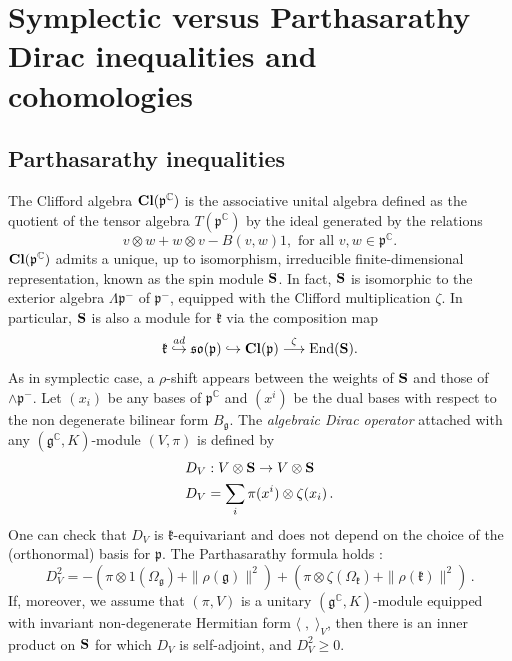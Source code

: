 \documentclass{amsart}[draft,11pt]
\newcommand{\mg}{\mathfrak{g}}
\newcommand{\mk}{\mathfrak{k}}
\newcommand{\fg}{{\mathfrak{g}}}
\newcommand{\fk}{{\mathfrak{k}}}
\newcommand{\fp}{{\mathfrak{p}}}
\numberwithin{equation}{section}
\theoremstyle{definition}
\begin{document}
\section{Symplectic versus Parthasarathy Dirac inequalities and cohomologies}
\label{comparison}

\subsection{Parthasarathy inequalities}

The Clifford algebra ${\bf Cl}(\fp^\mathbb{C})$ is the associative unital algebra defined as the quotient of the tensor algebra $T(\fp^\mathbb{C})$ by the ideal generated by the relations
\begin{equation*}
v\otimes w+w\otimes v-B(v,w) 1,\text{ for all }v,w\in \fp^\mathbb{C}.
\end{equation*}
${\bf Cl}(\fp^\mathbb{C})$ admits a unique, up to isomorphism, irreducible finite-dimensional representation, known as the spin module ${\bf S}$. In fact, ${\bf S}$ is isomorphic to the exterior algebra $\Lambda\fp^-$ of $\fp^-$, equipped with the Clifford multiplication $\zeta$. In particular, ${\bf S}$ is also a module for ${\mathfrak k}$ via the composition map
%
\begin{equation*}
\mathfrak{k}\stackrel{ad}\hookrightarrow\mathfrak{s}\mathfrak{o}(\mathfrak{\fp})\hookrightarrow{\bf Cl}(\fp)\stackrel{\zeta}\longrightarrow\text{End}({\bf S}).
\end{equation*}
As in symplectic case, a $\rho$-shift appears between the weights of ${\bf S}$ and those of $\wedge \fp^-$. 
% 
Let $(x_i)$ be any bases of $\fp^\mathbb{C}$ and $(x^i)$ be the 
dual bases with respect to the non degenerate bilinear form $B_\fg$.
The \emph{algebraic Dirac operator} attached with any $(\fg^\mathbb{C},K)$-module $(V,\pi)$ is defined by
\begin{align}\label{algdirac}
D_V&:V\otimes{\bf S}\rightarrow V\otimes{\bf S}\\
D_V&=\sum_i\pi(x^i)\otimes\zeta(x_i) \,.
\end{align}
One can check that $D_V$ is $\fk$-equivariant and does not depend on the choice of the (orthonormal) basis for $\fp$. The Parthasarathy formula holds :
$$ D_V^2 = -(\pi\otimes 1(\Omega_\mg)+\|\rho(\mg)\|^2) + (\pi\otimes \zeta (\Omega_\mk) +\|\rho(\mk)\|^2) \,.$$ 
If, moreover, we assume that $(\pi,V)$ is a unitary $(\fg^\mathbb{C},K)$-module equipped with invariant non-degenerate Hermitian form $\langle\;,\;\rangle_V$, then there is an inner product on ${\bf S}$ for which $D_V$ is self-adjoint, and $D_V^2\geq 0$.
\end{document}
